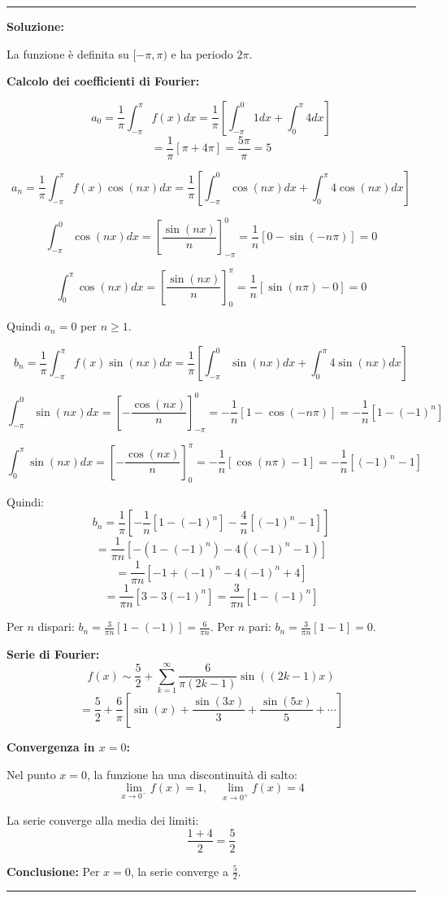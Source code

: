 \documentclass[12pt, a4paper]{article}
\newenvironment{solution}
{\par\noindent\rule{\textwidth}{0.4pt}\par\textbf{Soluzione:}\medskip\par}
{\par\rule{\textwidth}{0.4pt}\par\bigskip}
\begin{document}
\begin{solution}
La funzione è definita su $[-\pi, \pi)$ e ha periodo $2\pi$.

\textbf{Calcolo dei coefficienti di Fourier:}

\[
a_0 = \frac{1}{\pi} \int_{-\pi}^{\pi} f(x) dx = \frac{1}{\pi} \left[\int_{-\pi}^{0} 1 dx + \int_{0}^{\pi} 4 dx\right]
\]
\[
= \frac{1}{\pi} [\pi + 4\pi] = \frac{5\pi}{\pi} = 5
\]

\[
a_n = \frac{1}{\pi} \int_{-\pi}^{\pi} f(x) \cos(nx) dx = \frac{1}{\pi} \left[\int_{-\pi}^{0} \cos(nx) dx + \int_{0}^{\pi} 4\cos(nx) dx\right]
\]

\[
\int_{-\pi}^{0} \cos(nx) dx = \left[\frac{\sin(nx)}{n}\right]_{-\pi}^{0} = \frac{1}{n}[0 - \sin(-n\pi)] = 0
\]

\[
\int_{0}^{\pi} \cos(nx) dx = \left[\frac{\sin(nx)}{n}\right]_{0}^{\pi} = \frac{1}{n}[\sin(n\pi) - 0] = 0
\]

Quindi $a_n = 0$ per $n \geq 1$.

\[
b_n = \frac{1}{\pi} \int_{-\pi}^{\pi} f(x) \sin(nx) dx = \frac{1}{\pi} \left[\int_{-\pi}^{0} \sin(nx) dx + \int_{0}^{\pi} 4\sin(nx) dx\right]
\]

\[
\int_{-\pi}^{0} \sin(nx) dx = \left[-\frac{\cos(nx)}{n}\right]_{-\pi}^{0} = -\frac{1}{n}[1 - \cos(-n\pi)] = -\frac{1}{n}[1 - (-1)^n]
\]

\[
\int_{0}^{\pi} \sin(nx) dx = \left[-\frac{\cos(nx)}{n}\right]_{0}^{\pi} = -\frac{1}{n}[\cos(n\pi) - 1] = -\frac{1}{n}[(-1)^n - 1]
\]

Quindi:
\[
b_n = \frac{1}{\pi} \left[-\frac{1}{n}[1 - (-1)^n] - \frac{4}{n}[(-1)^n - 1]\right]
\]
\[
= \frac{1}{\pi n} \left[-(1 - (-1)^n) - 4((-1)^n - 1)\right]
\]
\[
= \frac{1}{\pi n} \left[-1 + (-1)^n - 4(-1)^n + 4\right]
\]
\[
= \frac{1}{\pi n} \left[3 - 3(-1)^n\right] = \frac{3}{\pi n}[1 - (-1)^n]
\]

Per $n$ dispari: $b_n = \frac{3}{\pi n}[1 - (-1)] = \frac{6}{\pi n}$.
Per $n$ pari: $b_n = \frac{3}{\pi n}[1 - 1] = 0$.

\textbf{Serie di Fourier:}
\[
f(x) \sim \frac{5}{2} + \sum_{k=1}^{\infty} \frac{6}{\pi(2k-1)} \sin((2k-1)x)
\]
\[
= \frac{5}{2} + \frac{6}{\pi} \left[\sin(x) + \frac{\sin(3x)}{3} + \frac{\sin(5x)}{5} + \cdots\right]
\]

\textbf{Convergenza in $x = 0$:}

Nel punto $x = 0$, la funzione ha una discontinuità di salto:
\[
\lim_{x \to 0^-} f(x) = 1, \quad \lim_{x \to 0^+} f(x) = 4
\]

La serie converge alla media dei limiti:
\[
\frac{1 + 4}{2} = \frac{5}{2}
\]

\textbf{Conclusione:} Per $x = 0$, la serie converge a $\frac{5}{2}$.
\end{solution}
\end{document}
